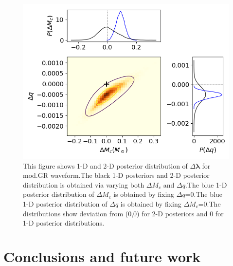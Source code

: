 \documentclass[prd,preprintnumbers,twocolumn,eqsecnum,floatfix,a4paper,nofootinbib,superscriptaddress]{revtex4}
\newcommand{\blambda}{\bm{\lambda}}
\begin{document}
\begin{figure}[h]
	\includegraphics*[scale=0.5]{./../../plots/triangle_plot_mod_gr}
	\caption{This figure shows 1-D and 2-D posterior distribution of $\Delta \blambda$ for mod.GR waveform.The black 1-D posteriors and 2-D posterior distribution is obtained via varying both $\Delta M_c$ and $\Delta q$.The blue 1-D posterior distribution of $\Delta M_c$  is obtained by fixing $\Delta q$=0.The blue 1-D posterior distribution of $\Delta q$  is obtained by fixing $\Delta M_c$=0.The distributions show deviation from (0,0) for 2-D posteriors and 0 for 1-D posterior distributions.}
\end{figure}
\section{Conclusions and future work}
%
%


\end{document}
